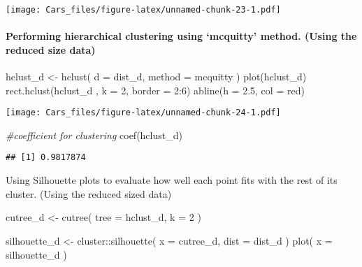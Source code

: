 \documentclass[
]{article}
\newenvironment{Shaded}{\begin{snugshade}}{\end{snugshade}}
\newcommand{\AttributeTok}[1]{\textcolor[rgb]{0.77,0.63,0.00}{#1}}
\newcommand{\CommentTok}[1]{\textcolor[rgb]{0.56,0.35,0.01}{\textit{#1}}}
\newcommand{\DecValTok}[1]{\textcolor[rgb]{0.00,0.00,0.81}{#1}}
\newcommand{\FloatTok}[1]{\textcolor[rgb]{0.00,0.00,0.81}{#1}}
\newcommand{\FunctionTok}[1]{\textcolor[rgb]{0.00,0.00,0.00}{#1}}
\newcommand{\NormalTok}[1]{#1}
\newcommand{\OtherTok}[1]{\textcolor[rgb]{0.56,0.35,0.01}{#1}}
\newcommand{\SpecialCharTok}[1]{\textcolor[rgb]{0.00,0.00,0.00}{#1}}
\newcommand{\StringTok}[1]{\textcolor[rgb]{0.31,0.60,0.02}{#1}}
\begin{document}
\texttt{[image: Cars\_files/figure-latex/unnamed-chunk-23-1.pdf]}

\hypertarget{performing-hierarchical-clustering-using-mcquitty-method.-using-the-reduced-size-data}{%
\paragraph{Performing hierarchical clustering using `mcquitty' method.
(Using the reduced size
data)}\label{performing-hierarchical-clustering-using-mcquitty-method.-using-the-reduced-size-data}}

\begin{Shaded}
\begin{Highlighting}[]
\NormalTok{hclust\_d }\OtherTok{\textless{}{-}} \FunctionTok{hclust}\NormalTok{(}
  \AttributeTok{d =}\NormalTok{ dist\_d,}
  \AttributeTok{method =} \StringTok{\textquotesingle{}mcquitty\textquotesingle{}}
\NormalTok{)}
\FunctionTok{plot}\NormalTok{(hclust\_d)}
\FunctionTok{rect.hclust}\NormalTok{(hclust\_d , }\AttributeTok{k =} \DecValTok{2}\NormalTok{, }\AttributeTok{border =} \DecValTok{2}\SpecialCharTok{:}\DecValTok{6}\NormalTok{)}
\FunctionTok{abline}\NormalTok{(}\AttributeTok{h =} \FloatTok{2.5}\NormalTok{, }\AttributeTok{col =} \StringTok{\textquotesingle{}red\textquotesingle{}}\NormalTok{)}
\end{Highlighting}
\end{Shaded}

\texttt{[image: Cars\_files/figure-latex/unnamed-chunk-24-1.pdf]}

\begin{Shaded}
\begin{Highlighting}[]
\CommentTok{\#coefficient for clustering}
\FunctionTok{coef}\NormalTok{(hclust\_d)}
\end{Highlighting}
\end{Shaded}

\begin{verbatim}
## [1] 0.9817874
\end{verbatim}

Using Silhouette plots to evaluate how well each point fits with the
rest of its cluster. (Using the reduced sized data)

\begin{Shaded}
\begin{Highlighting}[]
\NormalTok{cutree\_d }\OtherTok{\textless{}{-}} \FunctionTok{cutree}\NormalTok{(}
  \AttributeTok{tree =}\NormalTok{ hclust\_d,}
  \AttributeTok{k =} \DecValTok{2}
\NormalTok{)}

\NormalTok{silhouette\_d }\OtherTok{\textless{}{-}}\NormalTok{ cluster}\SpecialCharTok{::}\FunctionTok{silhouette}\NormalTok{(}
  \AttributeTok{x =}\NormalTok{ cutree\_d,}
  \AttributeTok{dist =}\NormalTok{ dist\_d}
\NormalTok{)}
\FunctionTok{plot}\NormalTok{(}
  \AttributeTok{x =}\NormalTok{ silhouette\_d}
\NormalTok{)}
\end{Highlighting}
\end{Shaded}
\end{document}
